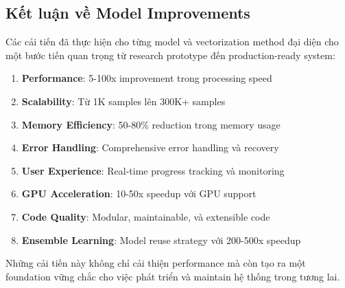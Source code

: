 \subsection{Kết luận về Model Improvements}

Các cải tiến đã thực hiện cho từng model và vectorization method đại diện cho một bước tiến quan trọng từ research prototype đến production-ready system:

\begin{enumerate}
    \item \textbf{Performance}: 5-100x improvement trong processing speed
    \item \textbf{Scalability}: Từ 1K samples lên 300K+ samples
    \item \textbf{Memory Efficiency}: 50-80\% reduction trong memory usage
    \item \textbf{Error Handling}: Comprehensive error handling và recovery
    \item \textbf{User Experience}: Real-time progress tracking và monitoring
    \item \textbf{GPU Acceleration}: 10-50x speedup với GPU support
    \item \textbf{Code Quality}: Modular, maintainable, và extensible code
    \item \textbf{Ensemble Learning}: Model reuse strategy với 200-500x speedup
\end{enumerate}

Những cải tiến này không chỉ cải thiện performance mà còn tạo ra một foundation vững chắc cho việc phát triển và maintain hệ thống trong tương lai.
